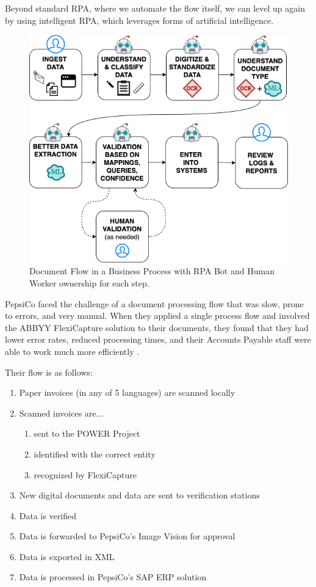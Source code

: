 \documentclass[conference]{IEEEtran}
\begin{document}
Beyond standard RPA, where we automate the flow itself, we can level up again by using intelligent RPA, which leverages forms of artificial intelligence.

\begin{figure}[ht]
\centerline{\includegraphics[width=\columnwidth]{BotFlow.png}}
\caption{Document Flow in a Business Process with RPA Bot and Human Worker ownership for each step.}
\label{figBotFlow}
\end{figure}

PepsiCo faced the challenge of a document processing flow that was slow, prone to errors, and very manual. When they applied a single process flow and involved the ABBYY FlexiCapture solution to their documents, they found that they had lower error rates, reduced processing times, and their Accounts Payable staff were able to work much more efficiently \cite{pepsico}.

Their flow is as follows:
\begin{enumerate}
\item Paper invoices (in any of 5 languages) are scanned locally
\item Scanned invoices are...
    \begin{enumerate}
        \item sent to the POWER Project
        \item identified with the correct entity
        \item recognized by FlexiCapture
    \end{enumerate}
\item New digital documents and data are sent to verification stations
\item Data is verified
\item Data is forwarded to PepsiCo's Image Vision for approval
\item Data is exported in XML
\item Data is processed in PepsiCo's SAP ERP solution
\end{enumerate}
\end{document}
